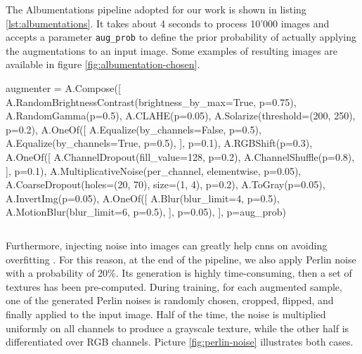 \medskip

The Albumentations pipeline adopted for our work is shown in listing \ref{lst:albumentations}. It takes about 4 seconds to process 10'000 images and accepts a parameter \texttt{aug\_prob} to define the prior probability of actually applying the augmentations to an input image. Some examples of resulting images are available in figure \ref{fig:albumentation-chosen}.

\vspace{0.1cm}
\begin{python}
augmenter = A.Compose([
	A.RandomBrightnessContrast(brightness_by_max=True, p=0.75),
	A.RandomGamma(p=0.5),
	A.CLAHE(p=0.05),
	A.Solarize(threshold=(200, 250), p=0.2),
	A.OneOf([
		A.Equalize(by_channels=False, p=0.5),
		A.Equalize(by_channels=True, p=0.5),
	], p=0.1),
	A.RGBShift(p=0.3),
	A.OneOf([
		A.ChannelDropout(fill_value=128, p=0.2),
		A.ChannelShuffle(p=0.8),
	], p=0.1),
	A.MultiplicativeNoise(per_channel, elementwise, p=0.05),
	A.CoarseDropout(holes=(20, 70), size=(1, 4), p=0.2),
	A.ToGray(p=0.05),
	A.InvertImg(p=0.05),
	A.OneOf([
		A.Blur(blur_limit=4, p=0.5),
		A.MotionBlur(blur_limit=6, p=0.5),
	], p=0.05),
], p=aug_prob)
\end{python}
\vspace{-0.5cm}
\begin{lstlisting}[frame=none,caption={Chosen Albumentations pipeline}, 
label=lst:albumentations]
\end{lstlisting}

Furthermore, injecting noise into images can greatly help \gls{cnn}s on avoiding overfitting \cite{shorten2019augmentationsurvey}. For this reason, at the end of the pipeline, we also apply Perlin noise \cite{perlin-noise} with a probability of 20\%. Its generation is highly time-consuming, then a set of textures has been pre-computed. During training, for each augmented sample, one of the generated Perlin noises is randomly chosen, cropped, flipped, and finally applied to the input image. Half of the time, the noise is multiplied uniformly on all channels to produce a grayscale texture, while the other half is differentiated over RGB channels. Picture \ref{fig:perlin-noise} illustrates both cases.

